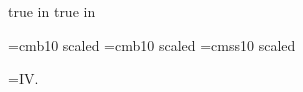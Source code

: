  true in
 true in




\font\boldtitlefont=cmb10 scaled
\font\smallboldtitle=cmb10 scaled 
\font\sans=cmss10 scaled

\footline={\hfil {\tenrm IV.\folio}\hfil}

\def\eps{{\varepsilon}}
\def\Eps{{\epsilon}}
\def\kap{{\kappa}}
\def\lam{{\lambda}}
\def\Lam{{\Lambda}}
\def\mynabla{{\nabla\!}}

\def\nspace{\lineskip=1pt\baselineskip=12pt%
     \lineskiplimit=0pt}
\def\dspace{\lineskip=2pt\baselineskip=18pt%
     \lineskiplimit=0pt}

\def\half{{\scriptstyle 1\over\scriptstyle 2}}
\def\w{{\mathchoice{\,{\scriptstyle\wedge}\,}
  {{\scriptstyle\wedge}}
  {{\scriptscriptstyle\wedge}}{{\scriptscriptstyle\wedge}}}}
\def\Le{{\mathchoice{\,{\scriptstyle\le}\,}
{\,{\scriptstyle\le}\,}
{\,{\scriptscriptstyle\le}\,}{\,{\scriptscriptstyle\le}\,}}}
\def\Ge{{\mathchoice{\,{\scriptstyle\ge}\,}
{\,{\scriptstyle\ge}\,}
{\,{\scriptscriptstyle\ge}\,}{\,{\scriptscriptstyle\ge}\,}}}
\def\plus{{\hbox{$\scriptscriptstyle +$}}}
\def\Item#1{\par%
     \smallskip\hang\indent\llap{\hbox to\parindent
     {#1\hfill\enspace}}\ignorespaces}

\def\im{{\rm Im}}  \def\Open{{\rm open}}
\def\Diff{{\rm Diff}}  \def\Closed{{\rm closed}}
\def\Map{{\rm Map}}  \def\spurious{{\rm spurious}}
\def\Met{{\rm Met}} \def\phys{{\rm phys}}
\def\diag{{\rm diag}}  \def\Vir{{\rm Vir}}
\def\spin{{\rm spin}} \def\Res{{\rm Res}}
\def\Null{{\rm null}} \def\mass{{\rm mass}}
\def\SO{{\rm SO}} \def\Tr{{\rm Tr\,}}
\def\SU{{\rm SU}} \def\tr{{\rm tr}}
\def\Weyl{{\rm Weyl}} \def\Ker{{\rm Ker}}
\def\Range{{\rm Range}} \def\SL{{\rm SL}}
\def\Det{{\rm Det}} \def\re{{\rm Re}}
\def\dist{{\rm dist}} \def\PSL{{\rm PSL}}
\def\Vol{{\rm Vol}} \def\ghosts{{\rm ghosts}}
\def\Fock{{\rm Fock}} \def\BRST{{\rm BRST}}
\def\inv{{\rm inv}}

\def\fbar{\bar{f}}  \def\mubar{\bar{\mu}}
\def\barh{\bar{h}}  \def\gammabar{\bar{\gamma}}
\def\kbar{\bar{k}}  \def\lambar{\bar{\lambda}}
\def\mbar{\bar{m}}  \def\phibar{\bar{\phi}}
\def\wbar{\bar{w}}  \def\etabar{\bar{\eta}}
\def\vbar{\bar{v}}  \def\partialbar{\bar{\partial}}
\def\xbar{\bar{x}}  \def\cbar{\bar{c}}
\def\zbar{\bar{z}}  \def\bbar{\bar{b}}
\def\Abar{\bar{A}}
\def\Kbar{\bar{K}}
\def\Pbar{\bar{P}}
\def\Sbar{\bar{S}}
\def\Tbar{\bar{T}}

